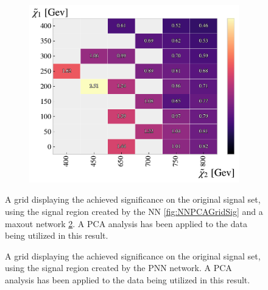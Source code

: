 \begin{figure}
{\begin{subfigure}{.5\textwidth}
        \includegraphics[width=\textwidth]{Figures/MLResults/NN/SUSY/Grid/MaxOutPCAGridSig.pdf}
        \caption{}
        \label{fig:MaxOutPCAGridSig}
    \end{subfigure}
    }
    \caption{A grid displaying the achieved significance on the original signal set, using the signal region 
    created by the \ac{NN} \ref{fig:NNPCAGridSig} and a maxout network \ref{fig:MaxOutPCAGridSig}. A \ac{PCA} 
    analysis has been applied to the data being utilized in this result.}
\end{figure}

\begin{figure}
    \caption{A grid displaying the achieved significance on the original signal set, using the signal region 
    created by the \ac{PNN} network. A \ac{PCA} analysis has been applied to the data being utilized in this result.}
    \label{fig:PNNPCAGridSig}
\end{figure}
\newpage